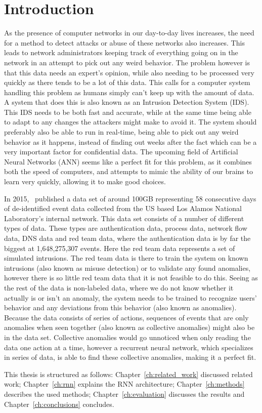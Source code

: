 \chapter{Introduction}\label{ch:introduction}
As the presence of computer networks in our day-to-day lives increases, the need for a method to detect attacks or abuse of these networks also increases. This leads to network administrators keeping track of everything going on in the network in an attempt to pick out any weird behavior. The problem however is that this data needs an expert's opinion, while also needing to be processed very quickly as there tends to be a lot of this data. This calls for a computer system handling this problem as humans simply can't keep up with the amount of data. A system that does this is also known as an Intrusion Detection System (IDS). This IDS needs to be both fast and accurate, while at the same time being able to adapt to any changes the attackers might make to avoid it. The system should preferably also be able to run in real-time, being able to pick out any weird behavior as it happens, instead of finding out weeks after the fact which can be a very important factor for confidential data. The upcoming field of Artificial Neural Networks (ANN) seems like a perfect fit for this problem, as it combines both the speed of computers, and attempts to mimic the ability of our brains to learn very quickly, allowing it to make good choices.

In 2015,~\cite{akent-2015-enterprise-data} published a data set of around 100GB representing 58 consecutive days of de-identified event data collected from the US based Los Alamos National Laboratory's internal network. This data set consists of a number of different types of data. These types are authentication data, process data, network flow data, DNS data and red team data, where the authentication data is by far the biggest at 1,648,275,307 events. Here the red team data represents a set of simulated intrusions. The red team data is there to train the system on known intrusions (also known as misuse detection) or to validate any found anomalies, however there is so little red team data that it is not feasible to do this. Seeing as the rest of the data is non-labeled data, where we do not know whether it actually is or isn't an anomaly, the system needs to be trained to recognize users' behavior and any deviations from this behavior (also known as anomalies). Because the data consists of series of actions, sequences of events that are only anomalies when seen together (also known as collective anomalies) might also be in the data set. Collective anomalies would go unnoticed when only reading the data one action at a time, however a recurrent neural network, which specializes in series of data, is able to find these collective anomalies, making it a perfect fit.

This thesis is structured as follows: Chapter~\ref{ch:related_work} discussed related work; Chapter~\ref{ch:rnn} explains the RNN architecture; Chapter~\ref{ch:methods} describes the used methods; Chapter~\ref{ch:evaluation} discusses the results and Chapter~\ref{ch:conclusions} concludes.
